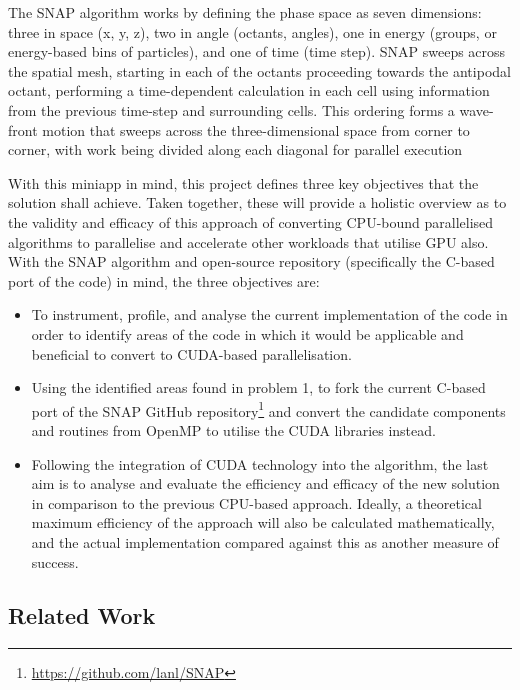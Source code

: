\documentclass[conference]{IEEEtran}
\begin{document}
The SNAP algorithm works by defining the phase space as seven dimensions: three in space (x, y, z), two in angle (octants, angles), one in energy (groups, or energy-based bins of particles), and one of time (time step). SNAP sweeps across the spatial mesh, starting in each of the octants proceeding towards the antipodal octant, performing a time-dependent calculation in each cell using information from the previous time-step and surrounding cells. This ordering forms a wave-front motion that sweeps across the three-dimensional space from corner to corner, with work being divided along each diagonal for parallel execution

With this miniapp in mind, this project defines three key objectives that the solution shall achieve. Taken together, these will provide a holistic overview as to the validity and efficacy of this approach of converting CPU-bound parallelised algorithms to parallelise and accelerate other workloads that utilise GPU also. With the SNAP algorithm and open-source repository (specifically the C-based port of the code) in mind, the three objectives are:

\begin{itemize}

\item To instrument, profile, and analyse the current implementation of the code in order to identify areas of the code in which it would be applicable and beneficial to convert to CUDA-based parallelisation.

\item Using the identified areas found in problem 1, to fork the current C-based port of the SNAP GitHub repository\footnote{\url{https://github.com/lanl/SNAP}} and convert the candidate components and routines from OpenMP to utilise the CUDA libraries instead.

\item Following the integration of CUDA technology into the algorithm, the last aim is to analyse and evaluate the efficiency and efficacy of the new solution in comparison to the previous CPU-based approach. Ideally, a theoretical maximum efficiency of the approach will also be calculated mathematically, and the actual implementation compared against this as another measure of success.

\end{itemize}


\subsection{Related Work}
\end{document}
